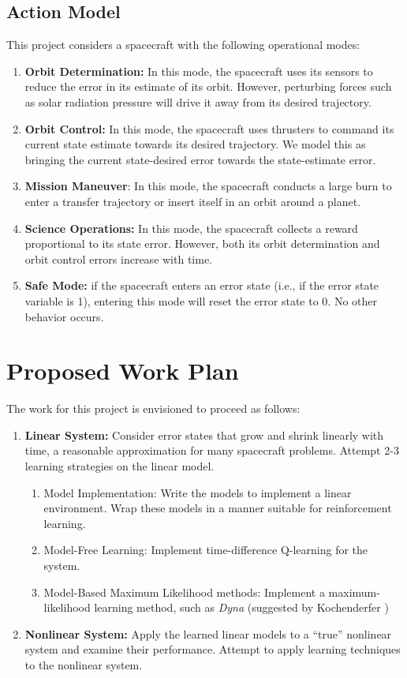 \documentclass[]{article}
\begin{document}
\subsection{Action Model}
This project considers a spacecraft with the following operational modes:
\begin{enumerate}
	\item \textbf{Orbit Determination:} In this mode, the spacecraft uses its sensors to reduce the error in its estimate of its orbit. However, perturbing forces such as solar radiation pressure will drive it away from its desired trajectory.
	
	\item \textbf{Orbit Control:} In this mode, the spacecraft uses thrusters to command its current state estimate towards its desired trajectory. We model this as bringing the current state-desired error towards the state-estimate error. 
	
	\item \textbf{Mission Maneuver}: In this mode, the spacecraft conducts a large burn to enter a transfer trajectory or insert itself in an orbit around a planet. 
	
	\item \textbf{Science Operations:} In this mode, the spacecraft collects a reward proportional to its state error. However, both its orbit determination and orbit control errors increase with time.
	
	\item \textbf{Safe Mode:} if the spacecraft enters an error state (i.e., if the error state variable is 1), entering this mode will reset the error state to 0. No other behavior occurs. 
\end{enumerate}

\section{Proposed Work Plan}

The work for this project is envisioned to proceed as follows:
\begin{enumerate}
	\item \textbf{Linear System:} Consider error states that grow and shrink linearly with time, a reasonable approximation for many spacecraft problems. Attempt 2-3 learning strategies on the linear model.
	\begin{enumerate}
		\item Model Implementation: Write the models to implement a linear environment. Wrap these models in a manner suitable for reinforcement learning.
		\item Model-Free Learning: Implement time-difference Q-learning for the system.
		\item Model-Based Maximum Likelihood methods: Implement a maximum-likelihood learning method, such as \textit{Dyna} (suggested by Kochenderfer \cite{bibid})
	\end{enumerate}
	\item \textbf{Nonlinear System:} Apply the learned linear models to a ``true'' nonlinear system and examine their performance. Attempt to apply learning techniques to the nonlinear system.
\end{enumerate}
	
\end{document}
